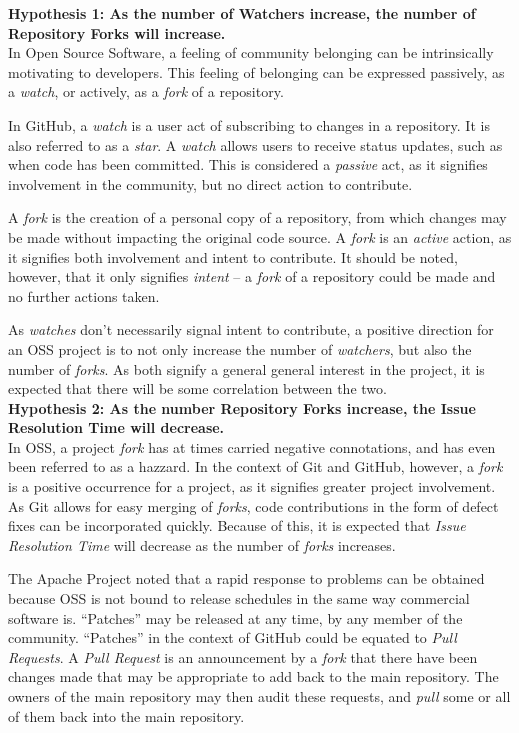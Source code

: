\documentclass{proc}
\begin{document}
\noindent \textbf{Hypothesis 1: As the number of Watchers increase, the number of Repository Forks will increase.}\\
In Open Source Software, a feeling of community belonging can be intrinsically motivating to developers\cite{lakhani2003hackers}. This feeling of belonging can be expressed passively, as a \emph{watch}, or actively, as a \emph{fork} of a repository. 

In GitHub, a \emph{watch} is a user act of subscribing to changes in a repository. It is also referred to as a \emph{star}. A \emph{watch} allows users to receive status updates, such as when code has been committed. This is considered a \emph{passive} act, as it signifies involvement in the community, but no direct action to contribute.

A \emph{fork} is the creation of a personal copy of a repository\cite{dabbish2012social}, from which changes may be made without impacting the original code source. A \emph{fork} is an \emph{active} action, as it signifies both involvement and intent to contribute. It should be noted, however, that it only signifies \emph{intent} -- a \emph{fork} of a repository could be made and no further actions taken.

As \emph{watches} don't necessarily signal intent to contribute, a positive direction for an OSS project is to not only increase the number of \emph{watchers}, but also the number of \emph{forks}. As both signify a general general interest in the project, it is expected that there will be some correlation between the two.\\

\noindent \textbf{Hypothesis 2: As the number Repository Forks increase, the Issue Resolution Time will decrease.}\\
In OSS, a project \emph{fork} has at times carried negative connotations, and has even been referred to as a hazzard\cite{kogut2001open}. In the context of Git and GitHub, however, a \emph{fork} is a positive occurrence for a project, as it signifies greater project involvement. As Git allows for easy merging of \emph{forks}, code contributions in the form of defect fixes can be incorporated quickly. Because of this, it is expected that \emph{Issue Resolution Time} will decrease as the number of \emph{forks} increases.

The Apache Project noted that a rapid response to problems can be obtained because OSS is not bound to release schedules in the same way commercial software is. ``Patches'' may be released at any time, by any member of the community\cite{mockus2000case}. ``Patches'' in the context of GitHub could be equated to \emph{Pull Requests}. A \emph{Pull Request} is an announcement by a \emph{fork} that there have been changes made that may be appropriate to add back to the main repository. The owners of the main repository may then audit these requests, and \emph{pull} some or all of them back into the main repository.
\end{document}
